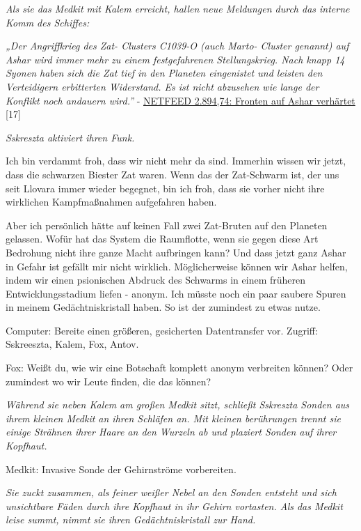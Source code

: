 \documentclass[11pt]{article}
\begin{document}
\emph{Als sie das Medkit mit Kalem erreicht, hallen neue Meldungen durch
das interne Komm des Schiffes:}

\emph{„Der Angriffkrieg des Zat- Clusters C1039-O (auch Marto- Cluster
genannt) auf Ashar wird immer mehr zu einem festgefahrenen
Stellungskrieg. Nach knapp 14 Syonen haben sich die Zat tief in den
Planeten eingenistet und leisten den Verteidigern erbitterten
Widerstand. Es ist nicht abzusehen wie lange der Konflikt noch andauern
wird.''} -
\href{http://1w6.org/deutsch/welten/raumzeit/netfeed-archiv/netfeed-flag-news/politics/netfeed-289474-fornten-auf-ashar-v}{NETFEED
2.894,74: Fronten auf Ashar verhärtet} {[}17{]}

\emph{Sskreszta aktiviert ihren Funk.}

Ich bin verdammt froh, dass wir nicht mehr da sind. Immerhin wissen wir
jetzt, dass die schwarzen Biester Zat waren. Wenn das der Zat-Schwarm
ist, der uns seit Llovara immer wieder begegnet, bin ich froh, dass sie
vorher nicht ihre wirklichen Kampfmaßnahmen aufgefahren haben.

Aber ich persönlich hätte auf keinen Fall zwei Zat-Bruten auf den
Planeten gelassen. Wofür hat das System die Raumflotte, wenn sie gegen
diese Art Bedrohung nicht ihre ganze Macht aufbringen kann? Und dass
jetzt ganz Ashar in Gefahr ist gefällt mir nicht wirklich.
Möglicherweise können wir Ashar helfen, indem wir einen psionischen
Abdruck des Schwarms in einem früheren Entwicklungsstadium liefen -
anonym. Ich müsste noch ein paar saubere Spuren in meinem
Gedächtniskristall haben. So ist der zumindest zu etwas nutze.

Computer: Bereite einen größeren, gesicherten Datentransfer vor.
Zugriff: Sskreeszta, Kalem, Fox, Antov.

Fox: Weißt du, wie wir eine Botschaft komplett anonym verbreiten können?
Oder zumindest wo wir Leute finden, die das können?

\emph{Während sie neben Kalem am großen Medkit sitzt, schließt Sskreszta
Sonden aus ihrem kleinen Medkit an ihren Schläfen an. Mit kleinen
berührungen trennt sie einige Strähnen ihrer Haare an den Wurzeln ab und
plaziert Sonden auf ihrer Kopfhaut.}

Medkit: Invasive Sonde der Gehirnströme vorbereiten.

\emph{Sie zuckt zusammen, als feiner weißer Nebel an den Sonden entsteht
und sich unsichtbare Fäden durch ihre Kopfhaut in ihr Gehirn vortasten.
Als das Medkit leise summt, nimmt sie ihren Gedächtniskristall zur
Hand.}
\end{document}
